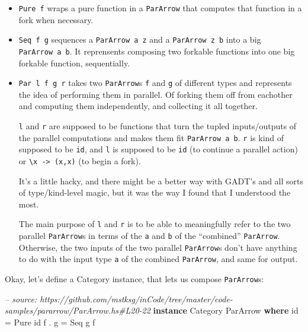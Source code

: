 \documentclass[]{article}
\newenvironment{Shaded}{}{}
\newcommand{\KeywordTok}[1]{\textcolor[rgb]{0.00,0.44,0.13}{\textbf{#1}}}
\newcommand{\DataTypeTok}[1]{\textcolor[rgb]{0.56,0.13,0.00}{#1}}
\newcommand{\CommentTok}[1]{\textcolor[rgb]{0.38,0.63,0.69}{\textit{#1}}}
\newcommand{\FunctionTok}[1]{\textcolor[rgb]{0.02,0.16,0.49}{#1}}
\newcommand{\NormalTok}[1]{#1}
\begin{document}
\begin{itemize}
\item
  \texttt{Pure\ f} wraps a pure function in a \texttt{ParArrow} that computes
  that function in a fork when necessary.
\item
  \texttt{Seq\ f\ g} sequences a \texttt{ParArrow\ a\ z} and a
  \texttt{ParArrow\ z\ b} into a big \texttt{ParArrow\ a\ b}. It reprensents
  composing two forkable functions into one big forkable function, sequentially.
\item
  \texttt{Par\ l\ f\ g\ r} takes two \texttt{ParArrow}s \texttt{f} and
  \texttt{g} of different types and represents the idea of performing them in
  parallel. Of forking them off from eachother and computing them independently,
  and collecting it all together.

  \texttt{l} and \texttt{r} are supposed to be functions that turn the tupled
  inputs/outputs of the parallel computations and makes them fit
  \texttt{ParArrow\ a\ b}. \texttt{r} is kind of supposed to be \texttt{id}, and
  \texttt{l} is supposed to be \texttt{id} (to continue a parallel action) or
  \texttt{\textbackslash{}x\ -\textgreater{}\ (x,x)} (to begin a fork).

  It's a little hacky, and there might be a better way with GADT's and all sorts
  of type/kind-level magic, but it was the way I found that I understood the
  most.

  The main purpose of \texttt{l} and \texttt{r} is to be able to meaningfully
  refer to the two parallel \texttt{ParArrow}s in terms of the \texttt{a} and
  \texttt{b} of the ``combined'' \texttt{ParArrow}. Otherwise, the two inputs of
  the two parallel \texttt{ParArrow}s don't have anything to do with the input
  type \texttt{a} of the combined \texttt{ParArrow}, and same for output.
\end{itemize}

Okay, let's define a Category instance, that lets us compose \texttt{ParArrow}s:

\begin{Shaded}
\begin{Highlighting}[]
\CommentTok{-- source: https://github.com/mstksg/inCode/tree/master/code-samples/pararrow/ParArrow.hs#L20-22}
\KeywordTok{instance} \DataTypeTok{Category} \DataTypeTok{ParArrow} \KeywordTok{where}
\NormalTok{    id    }\FunctionTok{=} \DataTypeTok{Pure}\NormalTok{ id}
\NormalTok{    f }\FunctionTok{.}\NormalTok{ g }\FunctionTok{=} \DataTypeTok{Seq}\NormalTok{ g f}
\end{Highlighting}
\end{Shaded}
\end{document}

